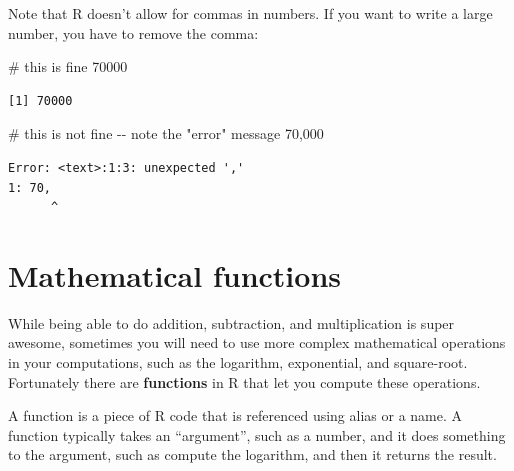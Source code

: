 \documentclass[
  letterpaper,
  DIV=11,
  numbers=noendperiod]{scrreprt}
\newenvironment{Shaded}{\begin{snugshade}}{\end{snugshade}}
\newcommand{\CommentTok}[1]{\textcolor[rgb]{0.37,0.37,0.37}{#1}}
\newcommand{\DecValTok}[1]{\textcolor[rgb]{0.68,0.00,0.00}{#1}}
\newcommand{\NormalTok}[1]{\textcolor[rgb]{0.00,0.23,0.31}{#1}}
\begin{document}
\begin{tcolorbox}[enhanced jigsaw, rightrule=.15mm, toptitle=1mm, title=\textcolor{quarto-callout-tip-color}{\faLightbulb}\hspace{0.5em}{No commas allowed!}, leftrule=.75mm, bottomtitle=1mm, colbacktitle=quarto-callout-tip-color!10!white, coltitle=black, titlerule=0mm, opacityback=0, colframe=quarto-callout-tip-color-frame, arc=.35mm, opacitybacktitle=0.6, bottomrule=.15mm, left=2mm, breakable, toprule=.15mm, colback=white]

Note that R doesn't allow for commas in numbers. If you want to write a
large number, you have to remove the comma:

\begin{Shaded}
\begin{Highlighting}[]
\CommentTok{\# this is fine}
\DecValTok{70000}
\end{Highlighting}
\end{Shaded}

\begin{verbatim}
[1] 70000
\end{verbatim}

\begin{Shaded}
\begin{Highlighting}[]
\CommentTok{\# this is not fine {-}{-} note the "error" message}
\DecValTok{70}\NormalTok{,}\DecValTok{000}
\end{Highlighting}
\end{Shaded}

\begin{verbatim}
Error: <text>:1:3: unexpected ','
1: 70,
      ^
\end{verbatim}

\end{tcolorbox}

\section{Mathematical functions}\label{mathematical-functions}

While being able to do addition, subtraction, and multiplication is
super awesome, sometimes you will need to use more complex mathematical
operations in your computations, such as the logarithm, exponential, and
square-root. Fortunately there are \textbf{functions} in R that let you
compute these operations.

A function is a piece of R code that is referenced using alias or a
name. A function typically takes an ``argument'', such as a number, and
it does something to the argument, such as compute the logarithm, and
then it returns the result.
\end{document}
